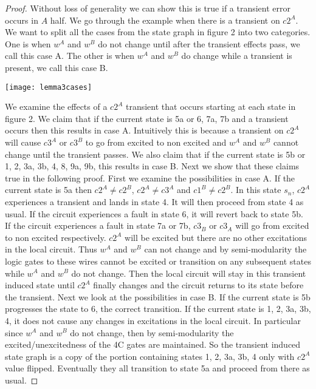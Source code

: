 \documentclass{article}
\begin{document}
\begin{proof}
Without loss of generality we can show this is true if a transient error occurs in $A$ half.  %
We go through the example when there is a transient on $c2^A$.  We want to split all the cases from the state graph in figure 2 into two categories.  One is when $w^A$ and $w^B$ do not change until after the transient effects pass, we call this case A.  The other is when $w^A$ and $w^B$ do change while a transient is present, we call this case B. \newline
\begin{center}
\texttt{[image: lemma3cases]}
\end{center} \newline
We examine the effects of a $c2^A$ transient that occurs starting at each state in figure 2.  We claim that if the current state is 5a or 6, 7a, 7b and a transient occurs then this results in case A.  Intuitively this is because a transient on $c2^A$ will cause $c3^A$ or $c3^B$ to go from excited to non excited and $w^A$ and $w^B$ cannot change until the transient passes.  We also claim that if the current state is 5b or 1, 2, 3a, 3b, 4, 8, 9a, 9b, this results in case B. \newline
Next we show that these claims true in the following proof.  First we examine the possibilities in case A.  If the current state is 5a then $c2^A \neq c2^B$, $c2^A \neq c3^A$ and $c1^B\neq c2^B$.
 In this state $s_n$, $c2^A$ experiences a transient and lands in state 4.  It will then proceed from state 4 as usual.   
If the circuit experiences a fault in state 6, it will revert back to state 5b.  If the circuit experiences a fault in state 7a or 7b, $c3_B$ or $c3_A$ will go from excited to non excited respectively.  $c2^A$ will be excited but there are no other excitations in the local circuit.  Thus $w^A$ and $w^B$ can not change and by semi-modularity the logic gates to these wires cannot be excited or transition on any subsequent states while $w^A$ and $w^B$ do not change.  Then the local circuit will stay in this transient induced state until $c2^A$ finally changes and the circuit returns to its state before the transient. \newline
Next we look at the possibilities in case B.  If the current state is 5b progresses the state to 6, the correct transition.
If the current state is 1, 2, 3a, 3b, 4, it does not cause any changes in excitations in the local circuit.  In particular since $w^A$ and $w^B$ do not change, then by semi-modularity the excited/unexcitedness of the 4C gates are maintained.  So the transient induced state graph is a copy of the portion containing states 1, 2, 3a, 3b, 4 only with $c2^A$ value flipped. Eventually they all transition to state 5a and proceed from there as usual.

\end{proof}
\end{document}
